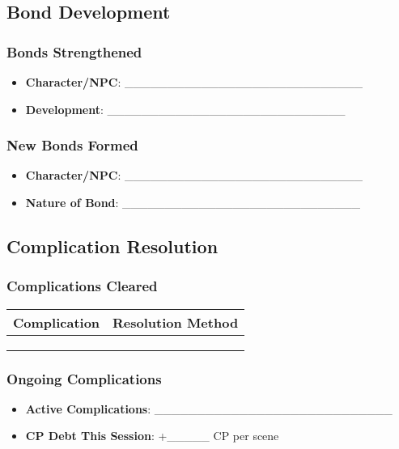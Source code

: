 \documentclass[11pt,letterpaper]{article}
\begin{document}
\subsection{Bond Development}

\subsubsection{Bonds Strengthened}
\begin{itemize}
    \item \textbf{Character/NPC}: \_\_\_\_\_\_\_\_\_\_\_\_\_\_\_\_\_\_\_\_\_\_\_\_\_\_\_\_
    \item \textbf{Development}: \_\_\_\_\_\_\_\_\_\_\_\_\_\_\_\_\_\_\_\_\_\_\_\_\_\_\_\_
\end{itemize}

\subsubsection{New Bonds Formed}
\begin{itemize}
    \item \textbf{Character/NPC}: \_\_\_\_\_\_\_\_\_\_\_\_\_\_\_\_\_\_\_\_\_\_\_\_\_\_\_\_
    \item \textbf{Nature of Bond}: \_\_\_\_\_\_\_\_\_\_\_\_\_\_\_\_\_\_\_\_\_\_\_\_\_\_\_\_
\end{itemize}

\subsection{Complication Resolution}

\subsubsection{Complications Cleared}
\begin{tabularx}{\textwidth}{|X|X|}
\hline
\textbf{Complication} & \textbf{Resolution Method} \\
\hline
& \\
& \\
& \\
\hline
\end{tabularx}

\subsubsection{Ongoing Complications}
\begin{itemize}
    \item \textbf{Active Complications}: \_\_\_\_\_\_\_\_\_\_\_\_\_\_\_\_\_\_\_\_\_\_\_\_\_\_\_\_
    \item \textbf{CP Debt This Session}: +\_\_\_\_\_ CP per scene
\end{itemize}
\end{document}
